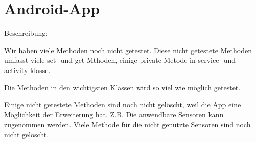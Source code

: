 \documentclass[a4paper]{scrreprt}
\begin{document}
			\section{Android-App}
                 Beschreibung:
                 \par Wir haben viele Methoden noch nicht getestet. Diese nicht getestete Methoden umfasst viele set- und get-Mthoden, einige private Metode in service- und activity-klasse.
                 \par Die Methoden in den wichtigsten Klassen wird so viel wie m\"oglich getestet.
                 \par Einige nicht getestete Methoden sind noch nicht gelöscht, weil die App eine M\"oglichkeit der Erweiterung hat. Z.B. Die anwendbare Sensoren kann zugenommen werden. Viele Methode f\"ur die nicht genutzte Sensoren sind noch nicht gelöscht.
\end{document}
